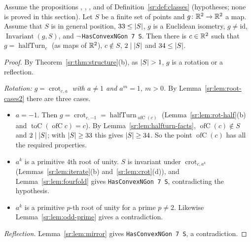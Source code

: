 \begin{theorem}\label{sr:thm:variant}
Assume the propositions , , ,  and
 of Definition~\ref{sr:def:classes} (hypotheses; none is proved in this section). Let $S$ be a
finite set of points and $g\colon\mathbb R^2\to\mathbb R^2$ a map. Assume that $S$ is in general position, $33\le\lvert S\rvert$, $g$ is a
Euclidean isometry, $g\ne\mathrm{id}$, $\operatorname{Invariant}(g,S)$, and $\neg$\,\texttt{HasConvexNGon 7 S}. Then
there is $c\in\mathbb R^2$ such that $g=\operatorname{halfTurn}_c$ (as maps of $\mathbb R^2$), $c\notin S$, $2\mid\lvert S\rvert$ and
$34\le\lvert S\rvert$.
\end{theorem}

\begin{proof}
By Theorem~\ref{sr:thm:structure}(b), as $\lvert S\rvert>1$, $g$ is a rotation or a reflection.

\emph{Rotation: $g=\operatorname{crot}_{c,a}$ with $a\ne1$ and $a^m=1$, $m>0$.} By Lemma~\ref{sr:lem:root-cases2} there
are three cases.
\begin{itemize}
\item $a=-1$. Then $g=\operatorname{crot}_{c,-1}=\operatorname{halfTurn}_{\operatorname{ofC}(c)}$
  (Lemma~\ref{sr:lem:rot-half}(b) and $\operatorname{toC}(\operatorname{ofC}c)=c$). By Lemma~\ref{sr:lem:halfturn-facts}, $\operatorname{ofC}(c)\notin S$ and
  $2\mid\lvert S\rvert$; with $\lvert S\rvert\ge33$ this gives $\lvert S\rvert\ge34$. So the point $\operatorname{ofC}(c)$ has all the
  required properties.
\item $a^k$ is a primitive $4$th root of unity. $S$ is invariant under $\operatorname{crot}_{c,a^k}$
  (Lemmas~\ref{sr:lem:iterate}(b) and~\ref{sr:lem:crot}(d)), and Lemma~\ref{sr:lem:fourfold} gives
  \texttt{HasConvexNGon 7 S}, contradicting the hypothesis.
\item $a^k$ is a primitive $p$-th root of unity for a prime $p\ne2$. Likewise Lemma~\ref{sr:lem:odd-prime} gives a
  contradiction.
\end{itemize}

\emph{Reflection.} Lemma~\ref{sr:lem:mirror} gives \texttt{HasConvexNGon 7 S}, a contradiction.
\end{proof}

